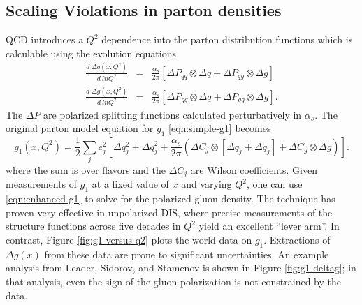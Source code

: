 \subsection{Scaling Violations in parton densities}

QCD introduces a \(Q^2\) dependence into the parton distribution functions which is calculable using the evolution equations
%
\begin{eqnarray}
  \frac{d~\Delta q(x,Q^2)}{d~ln Q^2} &=& \frac{\alpha_s}{2 \pi} \left[ \Delta P_{qq} \otimes \Delta q + \Delta P_{qg} \otimes \Delta g \right] \nonumber \\
  \frac{d~\Delta g(x,Q^2)}{d~ln Q^2} &=& \frac{\alpha_s}{2 \pi} \left[ \Delta P_{gq} \otimes \Delta q + \Delta P_{gg} \otimes \Delta g \right].
\end{eqnarray}
%
The \(\Delta P\) are polarized splitting functions calculated perturbatively in \(\alpha_s\).  The original parton model equation for \(g_1\) \ref{eqn:simple-g1} becomes
%
\begin{equation}
  g_1(x, Q^2) = \frac{1}{2} \sum_{j} e_j^2 \left[\Delta q_j^2 + \Delta \bar{q}_j^2 + \frac{\alpha_s}{2 \pi} \left(\Delta C_j \otimes \left[\Delta q_j + \Delta \bar{q}_j\right] + \Delta C_g \otimes \Delta g\right)\right].
  \label{eqn:enhanced-g1}
\end{equation}
%
where the sum is over flavors and the \(\Delta C_j\) are Wilson coefficients. Given measurements of \(g_1\) at a fixed value of \(x\) and varying \(Q^2\), one can use \ref{eqn:enhanced-g1} to solve for the polarized gluon density. The  technique has proven very effective in unpolarized DIS, where precise measurements of the structure functions across five decades in \(Q^2\) yield an excellent ``lever arm''.  In contrast, Figure \ref{fig:g1-versus-q2} plots the world data on \(g_1\).  Extractions of \(\Delta g(x)\) from these data are prone to significant uncertainties.  An example analysis from Leader, Sidorov, and Stamenov is shown in Figure \ref{fig:g1-deltag}; in that analysis, even the sign of the gluon polarization is not constrained by the data.

